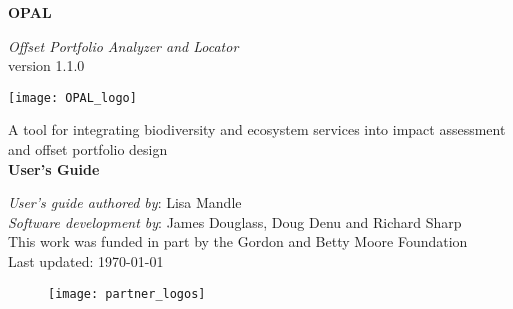 
\begin{titlepage}
    \begin{center}
        \vspace*{1cm}
        
        {\Huge \textbf{OPAL}}
        
        \vspace{0.5cm}
        {\Large \em Offset Portfolio Analyzer and Locator}\\
        \vspace{0.25cm}
        {\large version 1.1.0 }%
        
        \vspace{0.75cm}
        \texttt{[image: OPAL\_logo]}
        \vspace{0.75cm}
        
        {\Large A tool for integrating biodiversity and ecosystem services into impact assessment
        and offset portfolio design}\\
        \vspace{0.5cm}
        {\huge \textbf{User's Guide}}
      \end{center}        
        \vfill
        
        {\setlength{\parindent}{0cm}
        
        	{\em User's guide authored by}: Lisa Mandle\\
        	{\em Software development by}: James Douglass, Doug Denu and Richard Sharp\\
        	
        	This work was funded in part by the Gordon and Betty Moore Foundation\\
        	
        	Last updated: \today
        	
        }
        

        \begin{figure}[b]
        	\texttt{[image: partner\_logos]}
        \end{figure}
      
\end{titlepage}
